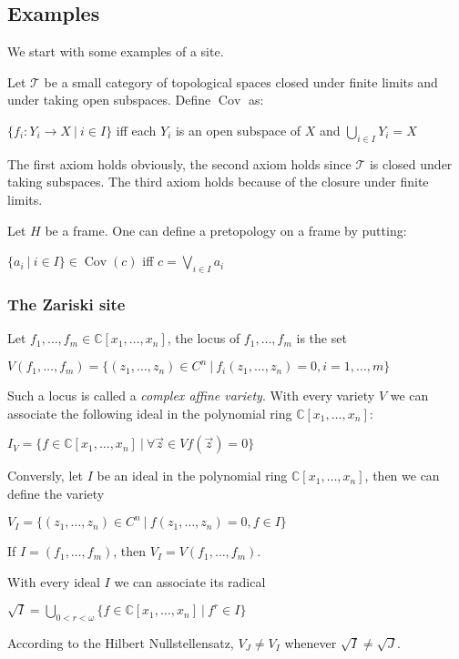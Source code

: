 \documentclass[a4paper]{article}
\theoremstyle{defin}
\theoremstyle{theorem}
\theoremstyle{claim}
\theoremstyle{prop}
\theoremstyle{lemma}
\theoremstyle{fact}
\theoremstyle{ex}
\theoremstyle{col}
\begin{document}
\subsection{Examples}

We start with some examples of a site.

Let $\mathcal{T}$ be a small category of topological spaces closed under finite limits and under taking open subspaces. Define $\operatorname{Cov}$ as:
\begin{center}
$\{ f_i : Y_i \to X \: | \: i \in I \}$ iff each $Y_i$ is an open subspace of $X$ and $\bigcup \limits_{i \in I} Y_i = X$
\end{center}

The first axiom holds obviously, the second axiom holds since $\mathcal{T}$ is closed under taking subspaces. The third axiom holds because of the closure under finite limits.

Let $H$ be a frame. One can define a pretopology on a frame by putting:
\begin{center}
$\{ a_i \: | \: i \in I \} \in \operatorname{Cov}(c)$ iff $c = \bigvee \limits_{i \in I} a_i$
\end{center}

\subsubsection{The Zariski site}

Let $f_1, \dots, f_m \in \mathbb{C}[x_1, \dots, x_n]$, the locus of $f_1, \dots, f_m$ is the set
\begin{center}
$V(f_1, \dots, f_m) = \{ (z_1, \dots, z_n) \in C^n \: | \: f_i(z_1, \dots, z_n) = 0, i = 1, \dots, m \}$
\end{center}
Such a locus is called a \emph{complex affine variety}. With every variety $V$ we can associate the following ideal in the polynomial ring $\mathbb{C}[x_1, \dots, x_n]$:
\begin{center}
$I_V = \{ f \in \mathbb{C}[x_1, \dots, x_n] \: | \: \forall \vec{z} \in V f(\vec{z}) = 0 \}$
\end{center}
Conversly, let $I$ be an ideal in the polynomial ring $\mathbb{C}[x_1, \dots, x_n]$, then we can define the variety
\begin{center}
$V_I = \{ (z_1, \dots, z_n) \in C^n \: | \: f(z_1, \dots, z_n) = 0, f \in I \} $
\end{center}
If $I = (f_1, \dots, f_m)$, then $V_I = V(f_1, \dots, f_m)$.

With every ideal $I$ we can associate its radical
\begin{center}
$\sqrt{I} = \bigcup \limits_{0 < r < \omega} \{ f \in \mathbb{C}[x_1, \dots, x_n] \: | \: f^r \in I \}$
\end{center}
According to the Hilbert Nullstellensatz, $V_J \neq V_I$ whenever $\sqrt{I} \neq \sqrt{J}$.
\end{document}

